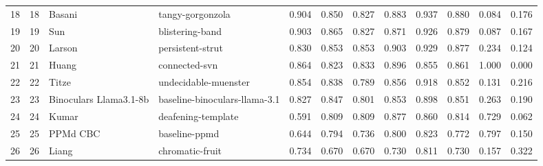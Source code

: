 \begin{tabular}{lrllrrrrrrrr}
18 & 18 & Basani & tangy-gorgonzola & 0.904 & 0.850 & 0.827 & 0.883 & 0.937 & 0.880 & 0.084 & 0.176 \\
19 & 19 & Sun & blistering-band & 0.903 & 0.865 & 0.827 & 0.871 & 0.926 & 0.879 & 0.087 & 0.167 \\
20 & 20 & Larson & persistent-strut & 0.830 & 0.853 & 0.853 & 0.903 & 0.929 & 0.877 & 0.234 & 0.124 \\
21 & 21 & Huang & connected-svn & 0.864 & 0.823 & 0.833 & 0.896 & 0.855 & 0.861 & 1.000 & 0.000 \\
22 & 22 & Titze & undecidable-muenster & 0.854 & 0.838 & 0.789 & 0.856 & 0.918 & 0.852 & 0.131 & 0.216 \\
23 & 23 & Binoculars Llama3.1-8b & baseline-binoculars-llama-3.1 & 0.827 & 0.847 & 0.801 & 0.853 & 0.898 & 0.851 & 0.263 & 0.190 \\
24 & 24 & Kumar & deafening-template & 0.591 & 0.809 & 0.809 & 0.877 & 0.860 & 0.814 & 0.729 & 0.062 \\
25 & 25 & PPMd CBC & baseline-ppmd & 0.644 & 0.794 & 0.736 & 0.800 & 0.823 & 0.772 & 0.797 & 0.150 \\
26 & 26 & Liang & chromatic-fruit & 0.734 & 0.670 & 0.670 & 0.730 & 0.811 & 0.730 & 0.157 & 0.322 \\
\bottomrule
\end{tabular}
